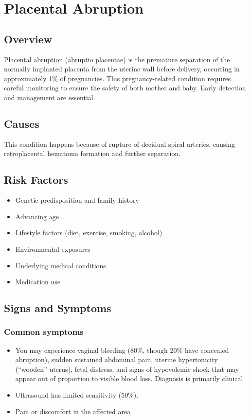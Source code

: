 \chapter{Placental Abruption}
\label{sec:Placental Abruption}

\section{Overview}
Placental abruption (abruptio placentae) is the premature separation of the normally implanted placenta from the uterine wall before delivery, occurring in approximately 1\% of pregnancies. This pregnancy-related condition requires careful monitoring to ensure the safety of both mother and baby. Early detection and management are essential.
\section{Causes}
This condition happens because of rupture of decidual spiral arteries, causing retroplacental hematoma formation and further separation.     
\section{Risk Factors}

\begin{itemize}[noitemsep]
  \item Genetic predisposition and family history
  \item Advancing age
  \item Lifestyle factors (diet, exercise, smoking, alcohol)
  \item Environmental exposures
  \item Underlying medical conditions
  \item Medication use
\end{itemize}
\section{Signs and Symptoms}

\subsection{Common symptoms}
\begin{itemize}[noitemsep]
  \item You may experience vaginal bleeding (80\%, though 20\% have concealed abruption), sudden sustained abdominal pain, uterine hypertonicity (``wooden'' uterus), fetal distress, and signs of hypovolemic shock that may appear out of proportion to visible blood loss. Diagnosis is primarily clinical
  \item Ultrasound has limited sensitivity (50\%).
  \item Pain or discomfort in the affected area
  \end{itemize}

